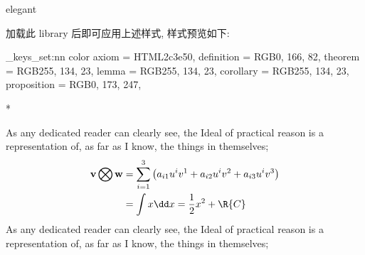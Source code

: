 \begin{function}[updated=2024-12-05]{elegant}
  \begin{syntax}
  \end{syntax}
  加载此 library 后即可应用上述样式, 样式预览如下: 
\end{function}
\begingroup
{}
\ExplSyntaxOn
\ztex_keys_set:nn {color}{
  axiom       = {HTML}{2c3e50},
  definition  = {RGB}{0, 166, 82},
  theorem     = {RGB}{255, 134, 23},
  lemma       = {RGB}{255, 134, 23},
  corollary   = {RGB}{255, 134, 23},
  proposition = {RGB}{0, 173, 247},
}
\ExplSyntaxOff
{}
\begin{DocExample}*
\begin{definition}
As any dedicated reader can clearly see, the Ideal of practical
reason is a representation of, as far as I know, the things in themselves; 
\begin{align}
\underset{}{\mathbf{v} \bigotimes \mathbf{w}} 
    & = \sum_{i=1}^3\left(a_{i1}u^iv^1+a_{i2}u^iv^2+a_{i3}u^iv^3\right) \\
    & = \int x \dd x = \frac12 x^2 + \R{C} 
  \end{align}  
As any dedicated reader can clearly see, the Ideal of practical
reason is a representation of, as far as I know, the things in themselves;%
\end{definition}
\end{DocExample}
\endgroup


